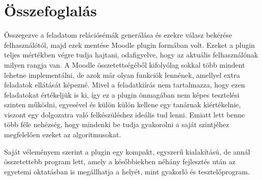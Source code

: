 \chapter{Összefoglalás}

Összegezve a feladatom relációsémák generálása és ezekre válasz bekérése felhasználótól, majd ezek mentése Moodle plugin formában volt. Ezeket a plugin teljes mértékben végre tudja hajtani, odafigyelve, hogy az aktuális felhasználónak milyen rangja van. A Moodle összetettségéből kifolyólag sokkal több mindent lehetne implementálni, de azok már olyan funkciók lennének, amellyel extra feladatok ellátását képezné. Mivel a feladatkiírás nem tartalmazza, hogy ezen feladatokat értékeljük is ki, így ez a plugin önmagában nem képes tesztelési szinten működni, egyesével és külön külön kellene egy tanárnak kiértékelnie, viszont egy dolgozatra való felkészüléshez ideális tud lenni. Emiatt lett benne több féle nehézség, hogy mindenki be tudja gyakorolni a saját szintjéhez megfelelően ezeket az algoritmusokat. \par
Saját véleményem szerint a plugin egy kompakt, egyszerű kialakítású, de annál összetettebb program lett, amely a későbbiekben néhány fejlesztés után az egyetemi oktatásban is megállhatja a helyét, mint gyakorló és tesztelőprogram. 